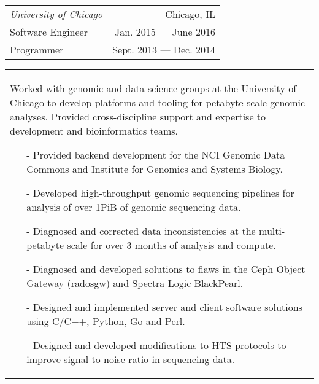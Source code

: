 \begin{tabularx}{\textwidth}{L R}
    \normalsize\textit{University of Chicago} & Chicago, IL \\
    \hspace{10pt}Software Engineer & Jan. 2015 --- June 2016 \\
    \hspace{10pt}Programmer & Sept. 2013 --- Dec. 2014 \\
\end{tabularx}
\begin{tabularx}{\textwidth}{X}
    \vspace{1pt}
    Worked with genomic and data science groups at the University of Chicago to develop platforms and tooling for petabyte-scale genomic analyses. Provided cross-discipline support and expertise to development and bioinformatics teams.
    \begin{itemize}
        \itemsep{}
        \item[-] Provided backend development for the NCI Genomic Data Commons and Institute for Genomics and Systems Biology.
        \item[-] Developed high-throughput genomic sequencing pipelines for analysis of over 1PiB of genomic sequencing data.
        \item[-] Diagnosed and corrected data inconsistencies at the multi-petabyte scale for over 3 months of analysis and compute.
        \item[-] Diagnosed and developed solutions to flaws in the Ceph Object Gateway (radosgw) and Spectra Logic BlackPearl.
        \item[-] Designed and implemented server and client software solutions using C/C++, Python, Go and Perl.
        \item[-] Designed and developed modifications to HTS protocols to improve signal-to-noise ratio in sequencing data.
    \end{itemize}
\end{tabularx}
